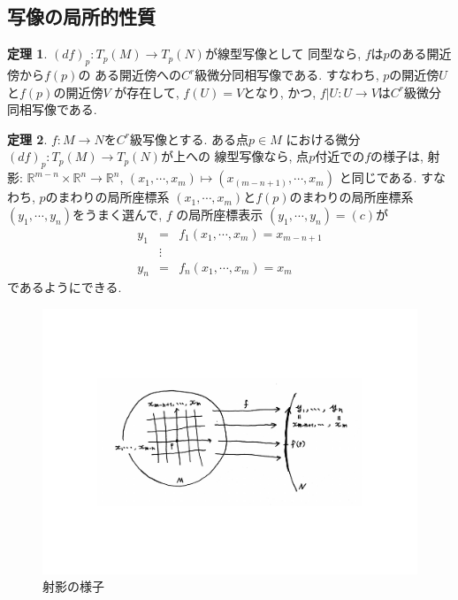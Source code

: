 \documentclass[a4j,12pt]{jarticle}
\theoremstyle{definition}
\newtheorem{theorem}{定理}[section]
\begin{document}
\subsection{写像の局所的性質}
\begin{theorem}\label{theo:f^(-1)theorem}
    $(df)_p:T_p(M)\to T_p(N)$が線型写像として
    同型なら, $f$は$p$のある開近傍から$f(p)$の
    ある開近傍への$C^r$級微分同相写像である. 
    すなわち, $p$の開近傍$U$と$f(p)$の開近傍$V$
    が存在して, $f(U)=V$となり, かつ, 
    $f|U:U \to V$は$C^r$級微分同相写像である. 
\end{theorem}
\begin{theorem}\label{theo: projection theorem}
    $f:M\to N$を$C^r$級写像とする. ある点$p\in M$
    における微分$(df)_p:T_p(M)\to T_p(N)$が上への
    線型写像なら, 点$p$付近での$f$の様子は, 射影:
    $\mathbb{R}^{m-n} \times \mathbb{R}^n \to \mathbb{R}^n$, 
    $(x_1, \cdots ,x_m)\mapsto (x_(m-n+1), \cdots ,x_m)$
    と同じである. すなわち, $p$のまわりの局所座標系
    $(x_1,\cdots ,x_m)$と$f(p)$のまわりの局所座標系
    $(y_1, \cdots ,y_n)$をうまく選んで, $f$
    の局所座標表示
    $(y_1, \cdots ,y_n)=(c)$が
    \begin{eqnarray*}
        y_1&=&f_1(x_1,\cdots ,x_m)=x_{m-n+1}\\
        &\vdots& \\
        y_n&=&f_n(x_1,\cdots ,x_m)=x_m
    \end{eqnarray*}
    であるようにできる. 
\end{theorem}
\begin{figure}[H]
    \centering
    \includegraphics[keepaspectratio, scale=0.5]{projectionTheorem.pdf}
    \caption{射影の様子}
    \label{projectionTheorem}
   \end{figure}
   
\end{document}
